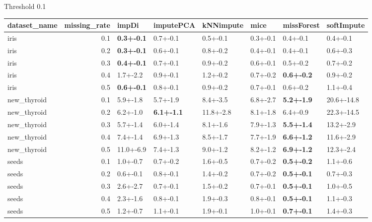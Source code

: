  Threshold 0.1 
 \begin{tabular}{lrllllll}
\toprule
dataset_name &  missing_rate &             impDi &         imputePCA & kNNimpute &     mice &        missForest & softImpute \\
\midrule
        iris &           0.1 & \textbf{0.3+-0.1} &          0.7+-0.1 &  0.5+-0.1 & 0.3+-0.1 &          0.4+-0.1 &   0.4+-0.1 \\
        iris &           0.2 & \textbf{0.3+-0.1} &          0.6+-0.1 &  0.8+-0.2 & 0.4+-0.1 &          0.4+-0.1 &   0.6+-0.3 \\
        iris &           0.3 & \textbf{0.4+-0.1} &          0.7+-0.1 &  0.9+-0.2 & 0.6+-0.1 &          0.5+-0.2 &   0.7+-0.2 \\
        iris &           0.4 &          1.7+-2.2 &          0.9+-0.1 &  1.2+-0.2 & 0.7+-0.2 & \textbf{0.6+-0.2} &   0.9+-0.2 \\
        iris &           0.5 & \textbf{0.6+-0.1} &          0.8+-0.1 &  0.9+-0.2 & 0.7+-0.1 &          0.6+-0.2 &   1.1+-0.4 \\
 new_thyroid &           0.1 &          5.9+-1.8 &          5.7+-1.9 &  8.4+-3.5 & 6.8+-2.7 & \textbf{5.2+-1.9} & 20.6+-14.8 \\
 new_thyroid &           0.2 &          6.2+-1.0 & \textbf{6.1+-1.1} & 11.8+-2.8 & 8.1+-1.8 &          6.4+-0.9 & 22.3+-14.5 \\
 new_thyroid &           0.3 &          5.7+-1.4 &          6.0+-1.4 &  8.1+-1.6 & 7.9+-1.3 & \textbf{5.5+-1.4} &  13.2+-2.9 \\
 new_thyroid &           0.4 &          7.4+-1.4 &          6.9+-1.3 &  8.5+-1.7 & 7.7+-1.9 & \textbf{6.6+-1.2} &  11.6+-2.9 \\
 new_thyroid &           0.5 &         11.0+-6.9 &          7.4+-1.3 &  9.0+-1.2 & 8.2+-1.2 & \textbf{6.9+-1.2} &  12.3+-2.4 \\
       seeds &           0.1 &          1.0+-0.7 &          0.7+-0.2 &  1.6+-0.5 & 0.7+-0.2 & \textbf{0.5+-0.2} &   1.1+-0.6 \\
       seeds &           0.2 &          0.6+-0.1 &          0.8+-0.1 &  1.4+-0.2 & 0.7+-0.2 & \textbf{0.5+-0.1} &   0.7+-0.3 \\
       seeds &           0.3 &          2.6+-2.7 &          0.7+-0.1 &  1.5+-0.2 & 0.7+-0.1 & \textbf{0.5+-0.1} &   1.0+-0.5 \\
       seeds &           0.4 &          2.3+-1.6 &          0.8+-0.1 &  1.9+-0.3 & 0.8+-0.1 & \textbf{0.5+-0.1} &   1.1+-0.3 \\
       seeds &           0.5 &          1.2+-0.7 &          1.1+-0.1 &  1.9+-0.1 & 1.0+-0.1 & \textbf{0.7+-0.1} &   1.4+-0.3 \\
\bottomrule
\end{tabular}
